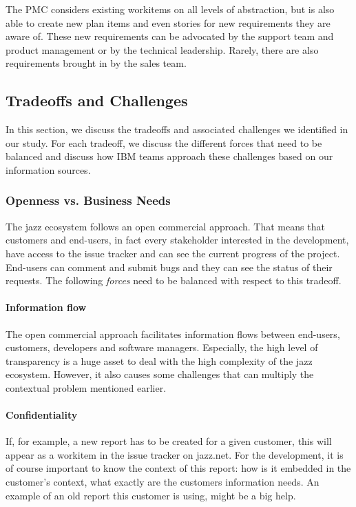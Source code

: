 The PMC considers existing workitems on all levels of abstraction, but is also able to create new plan items and even stories for new requirements they are aware of.
These new requirements can be advocated by the support team and product management or by the technical leadership. 
Rarely, there are also requirements brought in by the sales team.

\subsection{Tradeoffs and Challenges}
In this section, we discuss the tradeoffs and associated challenges we identified in our study.
For each tradeoff, we discuss the different forces that need to be balanced and discuss how IBM teams approach these challenges based on our information sources.

\subsubsection{Openness vs. Business Needs}
The jazz ecosystem follows an open commercial approach.
That means that customers and end-users, in fact every stakeholder interested in the development, have access to the issue tracker and can see the current progress of the project.
End-users can comment and submit bugs and they can see the status of their requests.
The following \emph{forces} need to be balanced with respect to this tradeoff.

\paragraph{Information flow} 
The open commercial approach facilitates information flows between end-users, customers, developers and software managers. 
Especially, the high level of transparency is a huge asset to deal with the high complexity of the jazz ecosystem. 
However, it also causes some challenges that can multiply the contextual problem mentioned earlier. 

\paragraph{Confidentiality} 
If, for example, a  new report has to be created for a given customer, this will appear as a workitem in the issue tracker on jazz.net. 
For the development, it is of course important to know the context of this report: how is it embedded in the customer's context, what exactly are the customers information needs.
An example of an old report this customer is using, might be a big help. 

